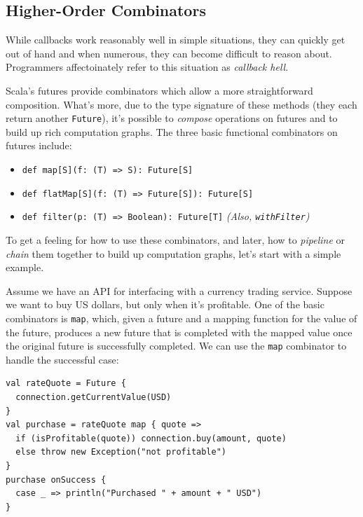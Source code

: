 

\subsection{Higher-Order Combinators}

While callbacks work reasonably well in simple situations, they can quickly get
out of hand and when numerous, they can become difficult to reason about.
Programmers affectoinately refer to this situation as {\em callback hell}.

Scala's futures provide combinators which allow a more straightforward
composition.  What's more, due to the type signature of these methods (they each
return another \verb|Future|), it's possible to {\em compose} operations on
futures and to build up rich computation graphs. The three basic functional
combinators on futures include:

\begin{itemize}
  \itemsep0em
  \item \verb|def map[S](f: (T) => S): Future[S]|
  \item \verb|def flatMap[S](f: (T) => Future[S]): Future[S]|
  \item \verb|def filter(p: (T) => Boolean): Future[T]| {\em (Also, \verb|withFilter|)}
\end{itemize}

To get a feeling for how to use these combinators, and later, how to {\em
pipeline} or {\em chain} them together to build up computation graphs, let's
start with a simple example.

Assume we have an API for interfacing with a currency trading service. Suppose
we want to buy US dollars, but only when it’s profitable. One of the basic
combinators is \verb|map|, which, given a future and a mapping function for the
value of the future, produces a new future that is completed with the mapped
value once the original future is successfully completed. We can use the
\verb|map| combinator to handle the successful case:

\begin{verbatim}
val rateQuote = Future {
  connection.getCurrentValue(USD)
}
val purchase = rateQuote map { quote =>
  if (isProfitable(quote)) connection.buy(amount, quote)
  else throw new Exception("not profitable")
}
purchase onSuccess {
  case _ => println("Purchased " + amount + " USD")
}
\end{verbatim}

